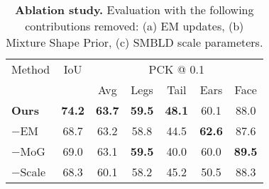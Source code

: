 
\begin{table}
    \begin{tabular}{@{}lcccccc@{}}
    \toprule
    \multicolumn{1}{l}{Method} & 
    \multicolumn{1}{c}{IoU} & 
    \multicolumn{5}{c}{PCK @ 0.1} \\
    \multicolumn{2}{c}{} &
    \multicolumn{1}{c}{Avg} &
    \multicolumn{1}{c}{Legs} &
    \multicolumn{1}{c}{Tail} &
    \multicolumn{1}{c}{Ears} &
    \multicolumn{1}{c}{Face} \\
    \midrule
    \textbf{Ours} & \textbf{74.2} & \textbf{63.7} & \textbf{59.5} & \textbf{48.1} & 60.1 & 88.0 \\
    $-$EM & 68.7 & 63.2 & 58.8 & 44.5 & \textbf{62.6} & 87.6 \\
    $-$MoG & 69.0 & 63.1 & \textbf{59.5} & 40.0 & 60.0 & \textbf{89.5} \\
    $-$Scale & 68.3 & 60.1 & 58.2 & 45.2 & 50.5 & 88.3 \\
    \bottomrule 
    \end{tabular}
    \caption[]{
        \label{tab:ablationfix}\textbf{Ablation study.} Evaluation with the following contributions removed: (a) EM updates, (b) Mixture Shape Prior, (c) SMBLD scale parameters.
    }
\end{table}
